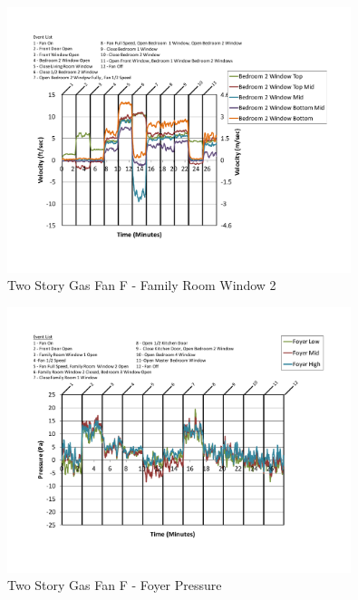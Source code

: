 \documentclass{article}
\begin{document}
\begin{appendices}
	\begin{figure}[H]
		\centering
		\includegraphics[height=3.05in,trim=0.67in 1.1in 0.67in 0.8in,clip=true]{0_Images/Results_Charts/ColdFlow/Two_Story/Gas/F/Family_Room_Window_2.pdf}
		\caption{Two Story Gas Fan F - Family Room Window 2}
	\end{figure}
 

	\begin{figure}[H]
		\centering
		\includegraphics[height=3.05in,trim=0.67in 1.1in 0.67in 0.8in,clip=true]{0_Images/Results_Charts/ColdFlow/Two_Story/Gas/F/Foyer_Pressure.pdf}
		\caption{Two Story Gas Fan F - Foyer Pressure}
	\end{figure}
 
	\clearpage


\end{appendices}
\end{document}
